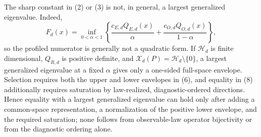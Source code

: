 The sharp constant in (2) or (3) is not, in general, a largest generalized eigenvalue. Indeed,
\[
 F_d(x)=\inf_{0<\alpha<1}\left\{
 \frac{c_{E,d}Q_{E,d}(x)}{\alpha}
 +\frac{c_{O,d}Q_{O,d}(x)}{1-\alpha}\right\}, \tag{9}
\]
so the profiled numerator is generally not a quadratic form. If \(\mathcal H_d\) is finite dimensional, \(Q_{R,d}\) is positive definite, and \(\mathcal X_d(P)=\mathcal H_d\setminus\{0\}\), a largest generalized eigenvalue at a fixed \(\alpha\) gives only a one-sided full-space envelope. Selection requires both the upper and lower envelopes in (6), and equality in (8) additionally requires saturation by law-realized, diagnostic-ordered directions. Hence equality with a largest generalized eigenvalue can hold only after adding a common-space representation, a normalization of the positive lower envelope, and the required saturation; none follows from observable-law operator bijectivity or from the diagnostic ordering alone.